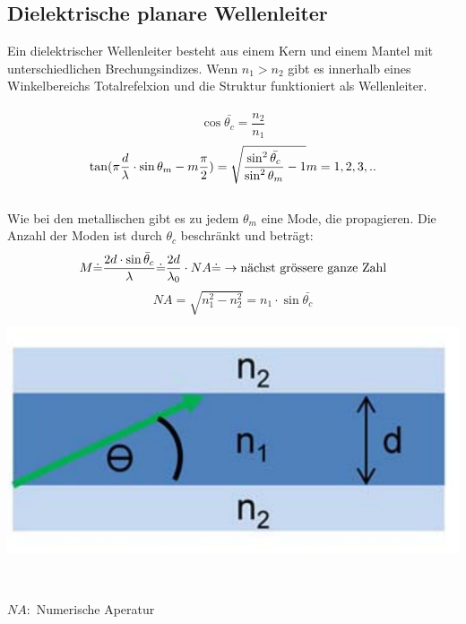 \subsection{Dielektrische planare Wellenleiter}
Ein dielektrischer Wellenleiter besteht aus einem Kern und einem Mantel mit unterschiedlichen Brechungsindizes. Wenn \textbf{$n_1>n_2$} gibt es innerhalb eines Winkelbereichs Totalrefelxion und die Struktur funktioniert als Wellenleiter.\\
\\
\[
	\cos \bar{\theta_c}=\frac{n_2}{n_1}
\]
\[
	\tan (\pi \frac d\lambda \cdot\sin \theta_m-m\frac{\pi}{2})=
	\sqrt{\frac{\sin^2 \bar{\theta_c}}{\sin^2\theta_m}-1} \\
	m=1,2,3,.. 
\]
\\
Wie bei den metallischen gibt es zu jedem $\theta_m$ eine Mode, die propagieren. Die Anzahl der Moden ist durch $\theta_c$ beschränkt und beträgt: \\
\[
	M \dot{=} \frac{2d\cdot\sin \bar{\theta}_c}{\lambda} \\
	\dot{=}\frac{2d}{\lambda_0}\cdot NA\\ \\ \\ \\
	\dot{=}\rightarrow \text{nächst grössere ganze Zahl}
\] 
\[
	NA=\sqrt{n_1^2-n_2^2}=n_1\cdot \sin \bar{\theta_c}
\]
\begin{center}
	\includegraphics[scale = 0.2]{../fig/dielektrische_WL.jpg}
\end{center}
\
\begin{footnotesize}
	$NA:$	Numerische Aperatur \\
\end{footnotesize}
\
\\
